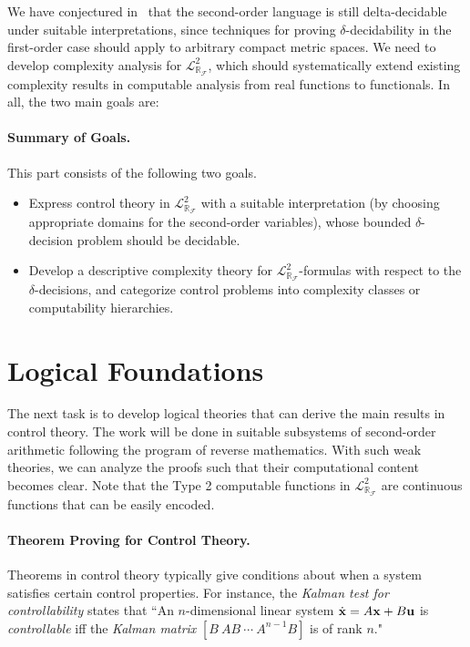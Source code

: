 \documentclass[10pt]{article}
\newcommand{\lrf}{\mathcal{L}_{\mathbb{R}_{\mathcal{F}}}}
\theoremstyle{definition}
\begin{document}
We have conjectured in~\cite{DBLP:conf/lics/GaoAC12} that the second-order language is still delta-decidable under suitable interpretations, since techniques for proving $\delta$-decidability in the first-order case should apply to arbitrary compact metric spaces. We need to develop complexity analysis for $\lrf^2$, which should systematically extend existing complexity results in computable analysis from real functions to functionals. In all, the two main goals are:

\paragraph{Summary of Goals.} This part consists of the following two goals. 
\begin{itemize}
\item Express control theory in $\mathcal{L}^2_{\mathbb{R}_{\mathcal{F}}}$ with a suitable interpretation (by choosing appropriate domains for the second-order variables), whose bounded $\delta$-decision problem should be decidable.
\item Develop a descriptive complexity theory for $\lrf^2$-formulas with respect to the $\delta$-decisions, and categorize control problems into complexity classes or computability hierarchies.
\end{itemize}


\section{Logical Foundations}


The next task is to develop logical theories that can derive the main results in control theory.
The work will be done in suitable subsystems of second-order arithmetic following the program of reverse mathematics. With such weak theories, we can analyze the proofs such that their computational content becomes clear. Note that the Type 2 computable functions in  $\lrf^2$ are continuous functions that can be easily encoded. 

\paragraph{Theorem Proving for Control Theory.} 
Theorems in control theory typically give conditions about when a system satisfies certain control properties. For instance, the {\em Kalman test for controllability} states that ``An $n$-dimensional linear system $\dot {\bf x} = A{\bf x}+B{\bf u}$ is {\em controllable} iff the {\em Kalman matrix}
$[B\ AB\ \cdots\ A^{n-1}B]$ is of rank $n$." 
\end{document}
